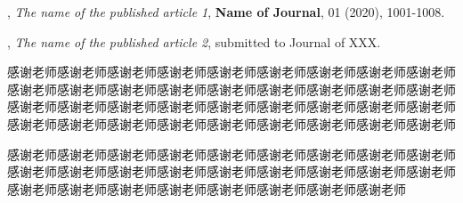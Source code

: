 \documentclass{shnuthesis}
\begin{document}


\nocite{*}  %




\begin{researchpage}


,  {\em The name of the published article 1}, {\bf Name of Journal}, 01 (2020), 1001-1008.


,  {\em The name of the published article 2}, submitted to
Journal of XXX.


\end{researchpage}




\begin{thankpage}
感谢老师感谢老师感谢老师感谢老师感谢老师感谢老师感谢老师感谢老师感谢老师感谢老师感谢老师感谢老师感谢老师感谢老师感谢老师感谢老师感谢老师感谢老师感谢老师感谢老师感谢老师感谢老师感谢老师感谢老师感谢老师感谢老师感谢老师感谢老师感谢老师感谢老师感谢老师感谢老师感谢老师感谢老师感谢老师感谢老师
		
感谢老师感谢老师感谢老师感谢老师感谢老师感谢老师感谢老师感谢老师感谢老师感谢老师感谢老师感谢老师感谢老师感谢老师感谢老师感谢老师感谢老师感谢老师感谢老师感谢老师感谢老师感谢老师感谢老师感谢老师感谢老师感谢老师

\end{thankpage}
	

	
	
\end{document}
